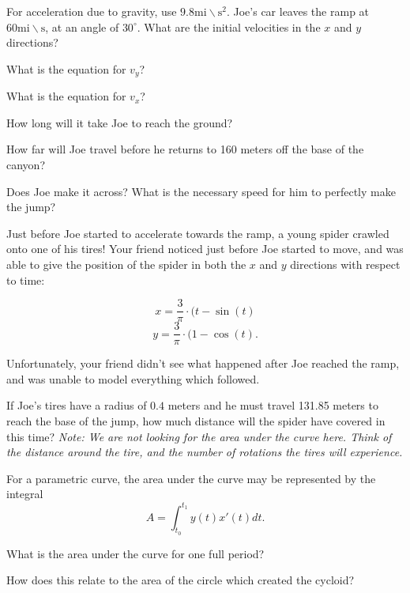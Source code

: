 \documentclass{ximera}
\begin{document}
For acceleration due to gravity, use $9.8 \text{mi} \backslash \text{s}^2$. Joe's car leaves the ramp at $60 \text{mi}\backslash \text{s}$, at an angle of $30^\circ$. What are the initial velocities in the $x$ and $y$ directions?

What is the equation for $v_{y}$?

What is the equation for $v_x$?

How long will it take Joe to reach the ground?

How far will Joe travel before he returns to 160 meters off the base of the canyon?

Does Joe make it across? What is the necessary speed for him to perfectly make the jump?


Just before Joe started to accelerate towards the ramp, a young spider crawled onto one of his tires! Your friend noticed just before Joe started to move, and was able to give the position of the spider in both the $x$ and $y$ directions with respect to time:

$$x = \dfrac{3}{\pi} \cdot (t - \sin(t)$$ $$y = \dfrac{3}{\pi} \cdot (1 - \cos(t)\text{.}$$

Unfortunately, your friend didn't see what happened after Joe reached the ramp, and was unable to model everything which followed.

If Joe's tires have a radius of $0.4$ meters and he must travel 131.85 meters to reach the base of the jump, how much distance will the spider have covered in this time? \textit{Note: We are not looking for the area under the curve here. Think of the distance around the tire, and the number of rotations the tires will experience.}

For a parametric curve, the area under the curve may be represented by the integral $$A = \int_{t_0}^{t_1} y(t)x'(t) dt \text{.}$$

What is the area under the curve for one full period?

How does this relate to the area of the circle which created the cycloid?
\end{document}

